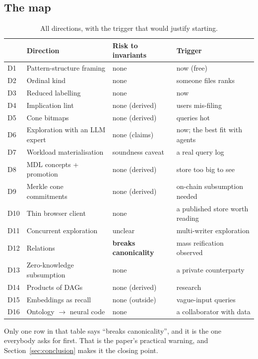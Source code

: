 \subsection{The map}

\begin{table}[h]\centering\small
\caption{All directions, with the trigger that would justify starting.}
\label{tab:directions}
\vspace{1mm}
\begin{tabularx}{\textwidth}{@{}p{0.7cm} p{4.5cm} p{2.2cm} X@{}}
\toprule
& \textbf{Direction} & \textbf{Risk to invariants} & \textbf{Trigger}\\
\midrule
D1 & Pattern-structure framing & none & now (free)\\
D2 & Ordinal kind & none & someone files ranks\\
D3 & Reduced labelling & none & now\\
D4 & Implication lint & none (derived) & users mis-filing\\
D5 & Cone bitmaps & none (derived) & queries hot\\
\midrule
D6 & Exploration with an LLM expert & none (claims) & now; the best fit with
     agents\\
D7 & Workload materialisation & soundness caveat & a real query log\\
D8 & MDL concepts + promotion & none (derived) & store too big to see\\
D9 & Merkle cone commitments & none (derived) & on-chain subsumption needed\\
D10 & Thin browser client & none & a published store worth reading\\
\midrule
D11 & Concurrent exploration & unclear & multi-writer exploration\\
D12 & Relations & \textbf{breaks canonicality} & mass reification observed\\
D13 & Zero-knowledge subsumption & none & a private counterparty\\
D14 & Products of DAGs & none (derived) & research\\
D15 & Embeddings as recall & none (outside) & vague-input queries\\
D16 & Ontology $\to$ neural code & none & a collaborator with data\\
\bottomrule
\end{tabularx}
\end{table}

Only one row in that table says ``breaks canonicality'', and it is the one
everybody asks for first. That is the paper's practical warning, and
Section~\ref{sec:conclusion} makes it the closing point.
